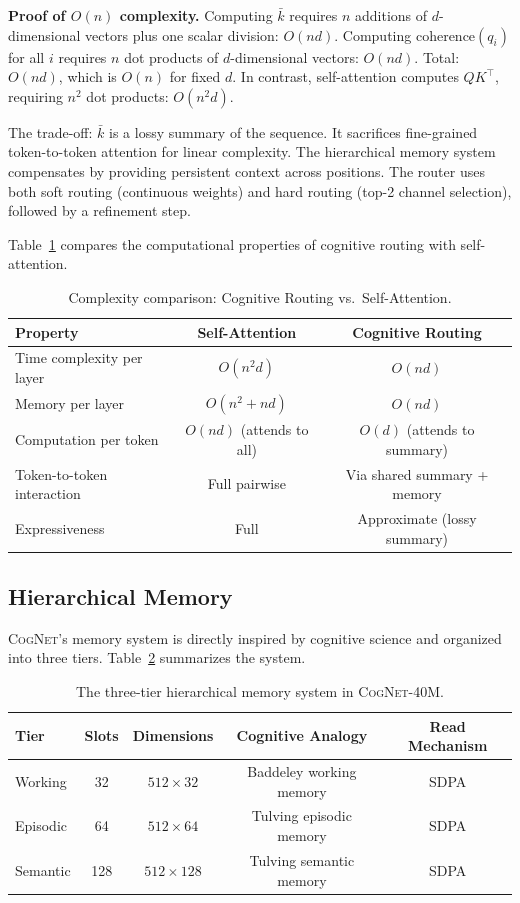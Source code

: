 \documentclass[11pt]{article}
\newcommand{\cognet}{\textsc{CogNet}}
\begin{document}
\textbf{Proof of $O(n)$ complexity.} Computing $\bar{k}$ requires $n$ additions of $d$-dimensional vectors plus one scalar division: $O(nd)$. Computing $\text{coherence}(q_i)$ for all $i$ requires $n$ dot products of $d$-dimensional vectors: $O(nd)$. Total: $O(nd)$, which is $O(n)$ for fixed $d$. In contrast, self-attention computes $QK^{\top}$, requiring $n^{2}$ dot products: $O(n^{2}d)$.

The trade-off: $\bar{k}$ is a lossy summary of the sequence. It sacrifices fine-grained token-to-token attention for linear complexity. The hierarchical memory system compensates by providing persistent context across positions. The router uses both soft routing (continuous weights) and hard routing (top-2 channel selection), followed by a refinement step.

Table~\ref{tab:complexity} compares the computational properties of cognitive routing with self-attention.

\begin{table}[htbp]
\centering
\caption{Complexity comparison: Cognitive Routing vs.\ Self-Attention.}
\label{tab:complexity}
\begin{tabular}{@{}lcc@{}}
\toprule
\textbf{Property} & \textbf{Self-Attention} & \textbf{Cognitive Routing} \\
\midrule
Time complexity per layer  & $O(n^{2}d)$ & $O(nd)$ \\
Memory per layer           & $O(n^{2}+nd)$ & $O(nd)$ \\
Computation per token      & $O(nd)$ (attends to all) & $O(d)$ (attends to summary) \\
Token-to-token interaction & Full pairwise & Via shared summary + memory \\
Expressiveness             & Full          & Approximate (lossy summary) \\
\bottomrule
\end{tabular}
\end{table}

\subsection{Hierarchical Memory}
\label{sec:cognet:memory}

\cognet{}'s memory system is directly inspired by cognitive science and organized into three tiers. Table~\ref{tab:memory} summarizes the system.

\begin{table}[htbp]
\centering
\caption{The three-tier hierarchical memory system in \cognet{}-40M.}
\label{tab:memory}
\begin{tabular}{@{}lcccc@{}}
\toprule
\textbf{Tier} & \textbf{Slots} & \textbf{Dimensions} & \textbf{Cognitive Analogy} & \textbf{Read Mechanism} \\
\midrule
Working  & 32  & $512 \times 32$  & Baddeley working memory & SDPA \\
Episodic & 64  & $512 \times 64$  & Tulving episodic memory & SDPA \\
Semantic & 128 & $512 \times 128$ & Tulving semantic memory & SDPA \\
\bottomrule
\end{tabular}
\end{table}
\end{document}

